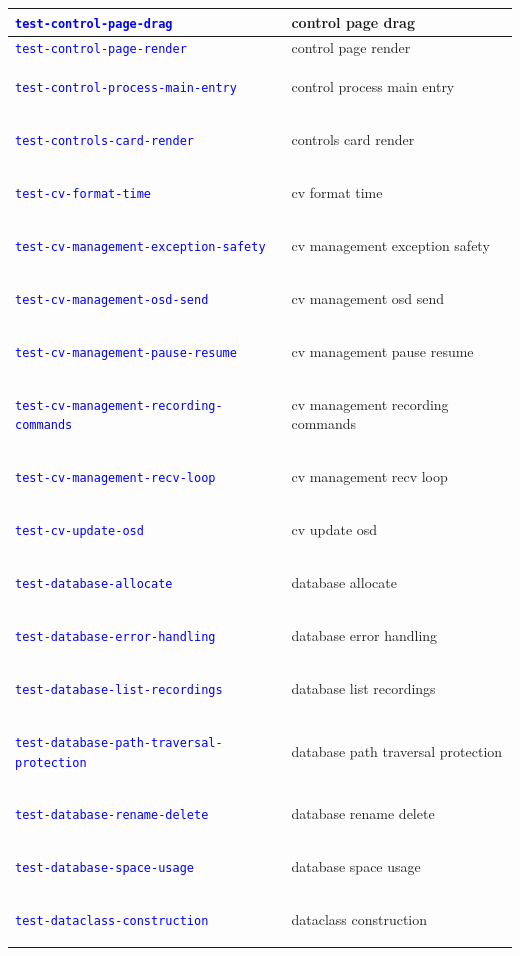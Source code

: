 \documentclass[12pt, titlepage]{article}
\newcommand{\tiddef}[1]{\hypertarget{tid:#1}{\textcolor{blue}{\texttt{#1}}}}
\begin{document}
\begin{longtable}{|>{\raggedright\arraybackslash}p{5cm}|>{\raggedright\arraybackslash}p{9cm}|}
  \tiddef{test-control-page-drag}                      & control page drag                      \\ \hline
  \tiddef{test-control-page-render}                    & control page render                    \\ \hline
  \tiddef{test-control-process-main-entry}             & control process main entry             \\ \hline
  \tiddef{test-controls-card-render}                   & controls card render                   \\ \hline
  \tiddef{test-cv-format-time}                         & cv format time                         \\ \hline
  \tiddef{test-cv-management-exception-safety}         & cv management exception safety         \\ \hline
  \tiddef{test-cv-management-osd-send}                 & cv management osd send                 \\ \hline
  \tiddef{test-cv-management-pause-resume}             & cv management pause resume             \\ \hline
  \tiddef{test-cv-management-recording-commands}       & cv management recording commands       \\ \hline
  \tiddef{test-cv-management-recv-loop}                & cv management recv loop                \\ \hline
  \tiddef{test-cv-update-osd}                          & cv update osd                          \\ \hline
  \tiddef{test-database-allocate}                      & database allocate                      \\ \hline
  \tiddef{test-database-error-handling}                & database error handling                \\ \hline
  \tiddef{test-database-list-recordings}               & database list recordings               \\ \hline
  \tiddef{test-database-path-traversal-protection}     & database path traversal protection     \\ \hline
  \tiddef{test-database-rename-delete}                 & database rename delete                 \\ \hline
  \tiddef{test-database-space-usage}                   & database space usage                   \\ \hline
  \tiddef{test-dataclass-construction}                 & dataclass construction                 \\ \hline

\end{longtable}
\end{document}
